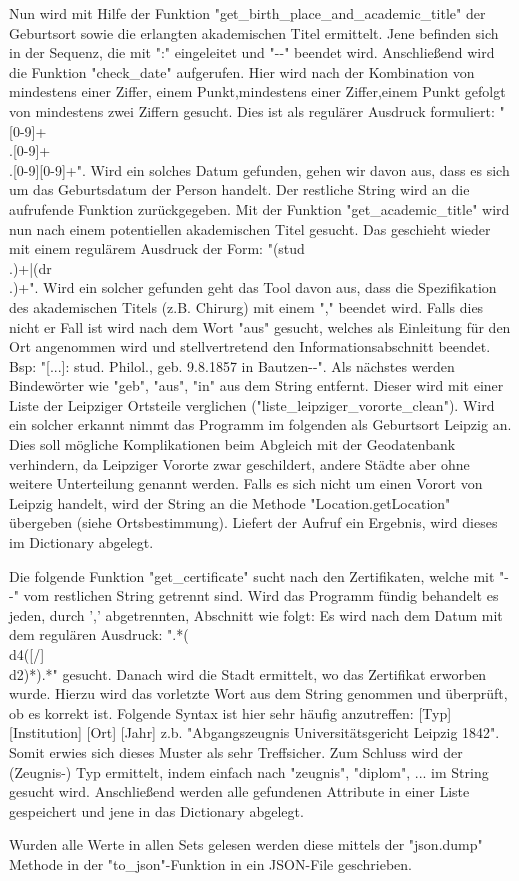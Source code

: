 Nun wird mit Hilfe der Funktion "{}get\_birth\_place\_and\_academic\_title"{} der Geburtsort sowie die erlangten akademischen Titel ermittelt. Jene befinden sich in der Sequenz, die mit ":" eingeleitet und "-{}-" beendet wird. Anschließend wird die Funktion "{}check\_date"{} aufgerufen. Hier wird nach der Kombination von mindestens einer Ziffer, einem Punkt,mindestens einer Ziffer,einem Punkt gefolgt von mindestens zwei Ziffern gesucht. Dies ist als regulärer Ausdruck formuliert: "{}[0-9]+\\.[0-9]+\\.[0-9][0-9]+"{}. Wird ein solches Datum gefunden, gehen wir davon aus, dass es sich um das Geburtsdatum der Person handelt. Der restliche String wird an die aufrufende Funktion zurückgegeben.
Mit der Funktion "{}get\_academic\_title"{} wird nun nach einem potentiellen akademischen Titel gesucht. Das geschieht wieder mit einem regulärem Ausdruck der Form: "{}(stud\\.)+|(dr\\.)+"{}. Wird ein solcher gefunden geht das Tool davon aus, dass die Spezifikation des akademischen Titels (z.B. Chirurg) mit einem "{},"{} beendet wird. Falls dies nicht er Fall ist wird nach dem Wort "{}aus"{} gesucht, welches als Einleitung für den Ort angenommen wird und stellvertretend den Informationsabschnitt beendet. Bsp: "{}[...]: stud. Philol., geb. 9.8.1857 in Bautzen-{}-"{}.
Als nächstes werden Bindewörter wie "{}geb"{}, "{}aus"{}, "{}in"{} aus dem String entfernt. Dieser wird mit einer Liste der Leipziger Ortsteile verglichen ("{}liste\_leipziger\_vororte\_clean"{}). Wird ein solcher erkannt nimmt das Programm im folgenden als Geburtsort Leipzig an. Dies soll mögliche Komplikationen beim Abgleich mit der Geodatenbank verhindern, da Leipziger Vororte zwar geschildert, andere Städte aber ohne weitere Unterteilung genannt werden. Falls es sich nicht um einen Vorort von Leipzig handelt, wird der String an die Methode "{}Location.getLocation"{} übergeben (siehe Ortsbestimmung). Liefert der Aufruf ein Ergebnis, wird dieses im Dictionary abgelegt.

Die folgende Funktion "{}get\_certificate"{} sucht nach den Zertifikaten, welche mit "-{}-" vom restlichen String getrennt sind. Wird das Programm fündig behandelt es jeden, durch '{},'{} abgetrennten, Abschnitt wie folgt:
Es wird nach dem Datum mit dem regulären Ausdruck: "{}.*(\\d{4}([/]\\d{2})*).*"{} gesucht. Danach wird die Stadt ermittelt, wo das Zertifikat erworben wurde. Hierzu wird das vorletzte Wort aus dem String genommen und überprüft, ob es korrekt ist. Folgende Syntax ist hier sehr häufig anzutreffen: [Typ] [Institution] [Ort] [Jahr] z.b. "{}Abgangszeugnis Universitätsgericht Leipzig 1842"{}. Somit erwies sich dieses Muster als sehr Treffsicher. Zum Schluss wird der (Zeugnis-) Typ ermittelt, indem einfach nach "{}zeugnis"{}, "{}diplom"{}, ... im String gesucht wird. Anschließend werden alle gefundenen Attribute in einer Liste gespeichert und jene in das Dictionary abgelegt.

Wurden alle Werte in allen Sets gelesen werden diese mittels der "{}json.dump"{} Methode in der "{}to\_json"{}-Funktion in ein JSON-File geschrieben.
